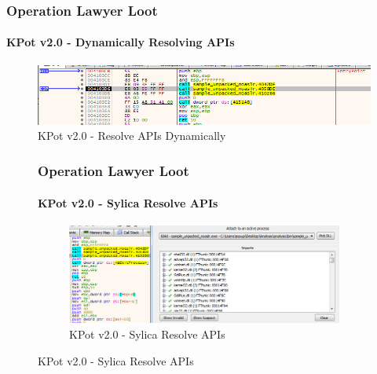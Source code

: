 \documentclass[aspectratio=169]{beamer}
\begin{document}
{
\begin{frame}
  \frametitle{Operation Lawyer Loot}
  \framesubtitle{KPot v2.0 - Dynamically Resolving APIs}
  \begin{figure}
    \includegraphics[width=14cm]{kpot-resolve-apis-debug}
    \caption{KPot v2.0 - Resolve APIs Dynamically}
  \end{figure}
\end{frame}
}

{
\begin{frame}
  \begin{figure}
    \frametitle{Operation Lawyer Loot}
    \framesubtitle{KPot v2.0 - Sylica Resolve APIs}
    \begin{figure}
      \includegraphics[width=12cm]{kpot-resolve-apis-sylica}
      \caption{KPot v2.0 - Sylica Resolve APIs}
    \end{figure}
  \end{figure}
\end{frame}
}
\end{document}
